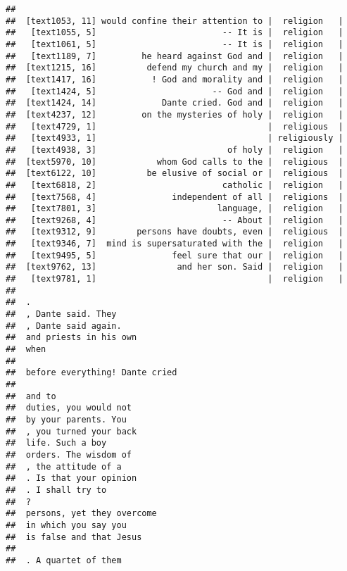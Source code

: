 \documentclass[]{article}
\begin{document}
\begin{verbatim}
##                                                                 
##  [text1053, 11] would confine their attention to |  religion   |
##   [text1055, 5]                         -- It is |  religion   |
##   [text1061, 5]                         -- It is |  religion   |
##   [text1189, 7]         he heard against God and |  religion   |
##  [text1215, 16]          defend my church and my |  religion   |
##  [text1417, 16]           ! God and morality and |  religion   |
##   [text1424, 5]                       -- God and |  religion   |
##  [text1424, 14]             Dante cried. God and |  religion   |
##  [text4237, 12]         on the mysteries of holy |  religion   |
##   [text4729, 1]                                  |  religious  |
##   [text4933, 1]                                  | religiously |
##   [text4938, 3]                          of holy |  religion   |
##  [text5970, 10]            whom God calls to the |  religious  |
##  [text6122, 10]          be elusive of social or |  religious  |
##   [text6818, 2]                         catholic |  religion   |
##   [text7568, 4]               independent of all |  religions  |
##   [text7801, 3]                        language, |  religion   |
##   [text9268, 4]                         -- About |  religion   |
##   [text9312, 9]        persons have doubts, even |  religious  |
##   [text9346, 7]  mind is supersaturated with the |  religion   |
##   [text9495, 5]               feel sure that our |  religion   |
##  [text9762, 13]                and her son. Said |  religion   |
##   [text9781, 1]                                  |  religion   |
##                                
##  .                             
##  , Dante said. They            
##  , Dante said again.           
##  and priests in his own        
##  when                          
##                                
##  before everything! Dante cried
##                                
##  and to                        
##  duties, you would not         
##  by your parents. You          
##  , you turned your back        
##  life. Such a boy              
##  orders. The wisdom of         
##  , the attitude of a           
##  . Is that your opinion        
##  . I shall try to              
##  ?                             
##  persons, yet they overcome    
##  in which you say you          
##  is false and that Jesus       
##                                
##  . A quartet of them
\end{verbatim}
\end{document}
